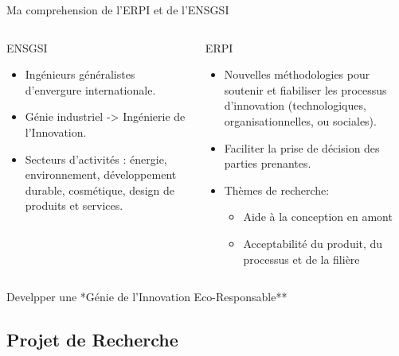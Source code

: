 \documentclass[
  11pt,
  ignorenonframetext,
  aspectratio=169,
  c]{beamer}
\providecommand{\tightlist}{%
  \setlength{\itemsep}{0pt}\setlength{\parskip}{0pt}}\usepackage{longtable,booktabs,array}
\begin{document}
\begin{frame}{Ma comprehension de l'ERPI et de l'ENSGSI}
\footnotesize

\begin{columns}[T]
\begin{column}[T]{0.5\textwidth}
ENSGSI

\begin{itemize}
\item
  Ingénieurs généralistes d'envergure internationale.
\item
  Génie industriel -\textgreater{} Ingénierie de l'Innovation.
\item
  Secteurs d'activités : énergie, environnement, développement durable,
  cosmétique, design de produits et services.
\end{itemize}
\end{column}

\begin{column}[T]{0.5\textwidth}
ERPI

\begin{itemize}
\item
  Nouvelles méthodologies pour soutenir et fiabiliser les processus
  d'innovation (technologiques, organisationnelles, ou sociales).
\item
  Faciliter la prise de décision des parties prenantes.
\item
  Thèmes de recherche:

  \begin{itemize}
  \tightlist
  \item
    Aide à la conception en amont
  \item
    Acceptabilité du produit, du processus et de la filière
  \end{itemize}
\end{itemize}
\end{column}
\end{columns}

\large

Develpper une *Génie de l'Innovation Eco-Responsable**

\normalsize
\end{frame}

\hypertarget{projet-de-recherche}{%
\subsection{Projet de Recherche}\label{projet-de-recherche}}
\end{document}
